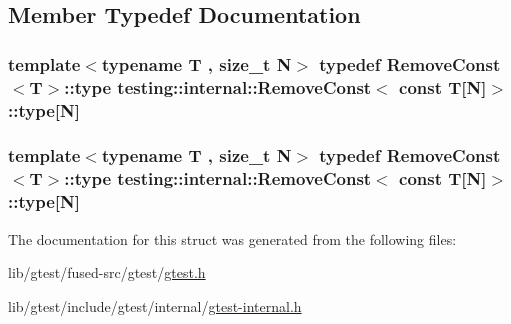 \subsection{Member Typedef Documentation}
\hypertarget{structtesting_1_1internal_1_1_remove_const_3_01const_01_t[_n]_4_ac976b53cb5d031a120fafbe790650068}{
\subsubsection[{type}]{\setlength{\rightskip}{0pt plus 5cm}template$<$typename T , size\-\_\-t N$>$ typedef {\bf Remove\-Const}$<$T$>$\-::type {\bf testing\-::internal\-::\-Remove\-Const}$<$ const T\mbox{[}N\mbox{]}$>$\-::type\mbox{[}N\mbox{]}}}\label{structtesting_1_1internal_1_1_remove_const_3_01const_01_t[_n]_4_ac976b53cb5d031a120fafbe790650068}
\hypertarget{structtesting_1_1internal_1_1_remove_const_3_01const_01_t[_n]_4_ac976b53cb5d031a120fafbe790650068}{
\subsubsection[{type}]{\setlength{\rightskip}{0pt plus 5cm}template$<$typename T , size\-\_\-t N$>$ typedef {\bf Remove\-Const}$<$T$>$\-::type {\bf testing\-::internal\-::\-Remove\-Const}$<$ const T\mbox{[}N\mbox{]}$>$\-::type\mbox{[}N\mbox{]}}}\label{structtesting_1_1internal_1_1_remove_const_3_01const_01_t[_n]_4_ac976b53cb5d031a120fafbe790650068}


The documentation for this struct was generated from the following files\-:\begin{DoxyCompactItemize}
\item 
lib/gtest/fused-\/src/gtest/\hyperlink{fused-src_2gtest_2gtest_8h}{gtest.\-h}\item 
lib/gtest/include/gtest/internal/\hyperlink{gtest-internal_8h}{gtest-\/internal.\-h}\end{DoxyCompactItemize}
